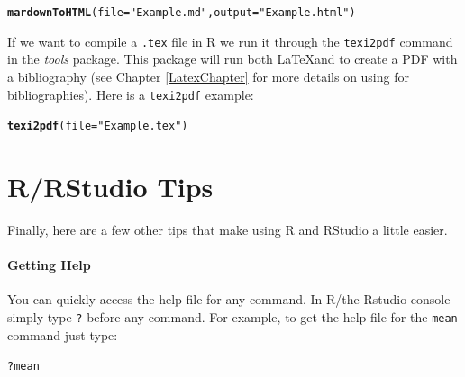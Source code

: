 \documentclass[ChapterTOCs,krantz1]{krantz}\usepackage{graphicx, color}
\makeatletter
\newcommand{\hlfunctioncall}[1]{\textcolor[rgb]{0.501960784313725,0,0.329411764705882}{\textbf{#1}}}%
\newcommand{\hlstring}[1]{\textcolor[rgb]{0.6,0.6,1}{#1}}%
\newenvironment{kframe}{%
 \def\at@end@of@kframe{}%
 \ifinner\ifhmode%
  \def\at@end@of@kframe{\end{minipage}}%
  \begin{minipage}{\columnwidth}%
 \fi\fi%
 \def\FrameCommand##1{\hskip\@totalleftmargin \hskip-\fboxsep
 \colorbox{shadecolor}{##1}\hskip-\fboxsep
     \hskip-\linewidth \hskip-\@totalleftmargin \hskip\columnwidth}%
 \MakeFramed {\advance\hsize-\width
   \@totalleftmargin\z@ \linewidth\hsize
   \@setminipage}}%
 {\par\unskip\endMakeFramed%
 \at@end@of@kframe}
\newenvironment{knitrout}{}{} %
\makeatother
\begin{document}
\begin{knitrout}
\color{fgcolor}\begin{kframe}
\begin{alltt}
\hlfunctioncall{mardownToHTML}(file = \hlstring{"Example.md"}, output = \hlstring{"Example.html"})
\end{alltt}
\end{kframe}
\end{knitrout}


\noindent If we want to compile a {\tt{.tex}} file in R we run it through the {\tt{texi2pdf}} command in the {\emph{tools}} package. This package will run both \LaTeX and \BibTeX to create a PDF with a bibliography (see Chapter \ref{LatexChapter} for more details on using \BibTeX for bibliographies). Here is a {\tt{texi2pdf}} example:

\begin{knitrout}
\color{fgcolor}\begin{kframe}
\begin{alltt}
\hlfunctioncall{texi2pdf}(file = \hlstring{"Example.tex"})
\end{alltt}
\end{kframe}
\end{knitrout}

 
\section{R/RStudio Tips}

Finally, here are a few other tips that make using R and RStudio a little easier.

\paragraph{Getting Help}

You can quickly access the help file for any command. In R/the Rstudio console simply type {\tt{?}} before any command. For example, to get the help file for the {\tt{mean}} command just type:

\begin{knitrout}
\color{fgcolor}\begin{kframe}
\begin{alltt}
?mean
\end{alltt}
\end{kframe}
\end{knitrout}
\end{document}

